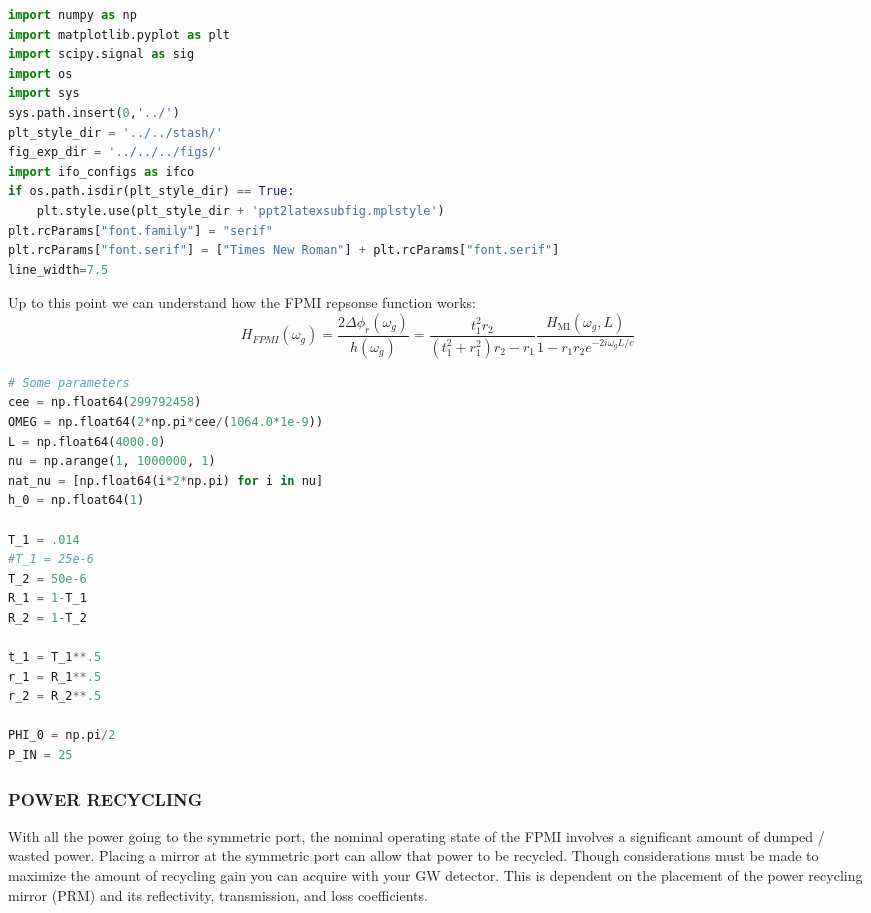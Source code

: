 \begin{spacing}{1.2}\begin{lstlisting}[frame=single, language=Python]
import numpy as np 
import matplotlib.pyplot as plt
import scipy.signal as sig
import os 
import sys
sys.path.insert(0,'../')
plt_style_dir = '../../stash/'
fig_exp_dir = '../../../figs/'
import ifo_configs as ifco
if os.path.isdir(plt_style_dir) == True:
    plt.style.use(plt_style_dir + 'ppt2latexsubfig.mplstyle')
plt.rcParams["font.family"] = "serif"
plt.rcParams["font.serif"] = ["Times New Roman"] + plt.rcParams["font.serif"]
line_width=7.5
\end{lstlisting}\end{spacing}

Up to this point we can understand how the FPMI repsonse function works:
\begin{equation} H_{FPMI}(\omega_g) = \frac{2 \Delta \phi_r(\omega_g)}{h(\omega_g)} =  \frac{t_1^2r_2}{(t_1^2 + r_1^2)r_2 -r_1} \frac{H_{\mathrm{MI}}(\omega_g, L)}{1-r_1r_2e^{-2i \omega_g L /c }}  \end{equation}

\begin{spacing}{1.2}\begin{lstlisting}[frame=single, language=Python]
# Some parameters
cee = np.float64(299792458)
OMEG = np.float64(2*np.pi*cee/(1064.0*1e-9))
L = np.float64(4000.0)
nu = np.arange(1, 1000000, 1)
nat_nu = [np.float64(i*2*np.pi) for i in nu]
h_0 = np.float64(1)

T_1 = .014
#T_1 = 25e-6 
T_2 = 50e-6
R_1 = 1-T_1
R_2 = 1-T_2

t_1 = T_1**.5
r_1 = R_1**.5
r_2 = R_2**.5 

PHI_0 = np.pi/2 
P_IN = 25
\end{lstlisting}\end{spacing}

\subsubsection*{POWER RECYCLING}

With all the power going to the symmetric port, the nominal operating
state of the FPMI involves a significant amount of dumped / wasted
power. Placing a mirror at the symmetric port can allow that power to be
recycled. Though considerations must be made to maximize the amount of
recycling gain you can acquire with your GW detector. This is dependent
on the placement of the power recycling mirror (PRM) and its
reflectivity, transmission, and loss coefficients.

